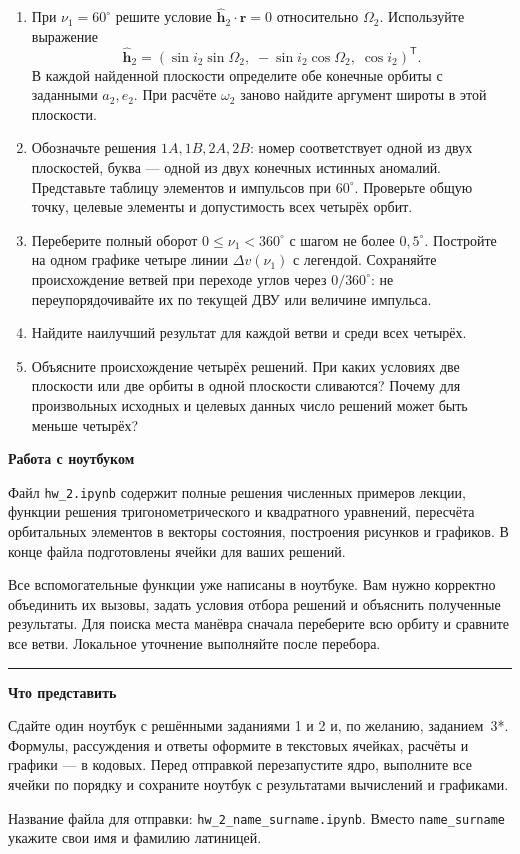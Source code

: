 \documentclass[11pt,a4paper]{article}
\begin{document}
\begin{enumerate}
\item При $\nu_1=60^\circ$ решите условие
$\widehat{\mathbf h}_2\cdot\mathbf r=0$ относительно $\Omega_2$.
Используйте выражение
\[
\widehat{\mathbf h}_2=
(\sin i_2\sin\Omega_2,\;-\sin i_2\cos\Omega_2,\;\cos i_2)^{\mathsf T}.
\]
В каждой найденной плоскости определите обе конечные орбиты с заданными
$a_2,e_2$. При расчёте $\omega_2$ заново найдите аргумент широты в этой плоскости.
\item Обозначьте решения $1A,1B,2A,2B$: номер соответствует одной из двух
плоскостей, буква --- одной из двух конечных истинных аномалий.
Представьте таблицу элементов и импульсов при $60^\circ$.
Проверьте общую точку, целевые элементы и допустимость всех четырёх орбит.
\item Переберите полный оборот $0\le\nu_1<360^\circ$ с шагом не более
$0{,}5^\circ$. Постройте на одном графике четыре линии $\Delta v(\nu_1)$
с легендой. Сохраняйте происхождение ветвей при переходе углов через
$0/360^\circ$: не переупорядочивайте их по текущей ДВУ или величине импульса.
\item Найдите наилучший результат для каждой ветви и среди всех четырёх.
\item Объясните происхождение четырёх решений. При каких условиях две
плоскости или две орбиты в одной плоскости сливаются?
Почему для произвольных исходных и целевых данных число решений может быть меньше четырёх?
\end{enumerate}

\vspace{4pt}
\textbf{Работа с ноутбуком}

Файл \texttt{hw\_2.ipynb} содержит полные решения численных примеров лекции,
функции решения тригонометрического и квадратного уравнений, пересчёта
орбитальных элементов в векторы состояния, построения рисунков и графиков.
В конце файла подготовлены ячейки для ваших решений.

Все вспомогательные функции уже написаны в ноутбуке. Вам нужно корректно
объединить их вызовы, задать условия отбора решений и объяснить полученные результаты.
Для поиска места манёвра сначала переберите всю орбиту и сравните все ветви.
Локальное уточнение выполняйте после перебора.

\vspace{5pt}
{\color{rulecolor}\hrule}
\vspace{5pt}
\textbf{Что представить}

Сдайте один ноутбук с решёнными заданиями 1 и 2 и, по желанию, заданием~3*.
Формулы, рассуждения и ответы оформите в текстовых ячейках, расчёты и графики
--- в кодовых. Перед отправкой перезапустите ядро, выполните все ячейки
по порядку и сохраните ноутбук с результатами вычислений и графиками.

Название файла для отправки: \texttt{hw\_2\_name\_surname.ipynb}.
Вместо \texttt{name\_surname} укажите свои имя и фамилию латиницей.
\end{document}
